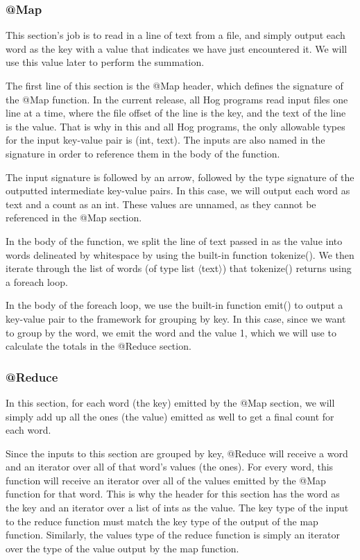 \documentclass{article} \usepackage{fancyhdr, multicol}
\begin{document}
\subsubsection*{@Map}
This section's job is to read in a line of text from a file, and simply output each word as the key with a value that indicates we have just encountered it. We will use this value later to perform the summation.

The first line of this section is the @Map header, which defines the signature of the @Map function. In the current release, all Hog programs read input files one line at a time, where the file offset of the line is the key, and the text of the line is the value. That is why in this and all Hog programs, the only allowable types for the input key-value pair is (int, text). The inputs are also named in the signature in order to reference them in the body of the function.

The input signature is followed by an arrow, followed by the type signature of the outputted intermediate key-value pairs. In this case, we will output each word as text and a count as an int. These values are unnamed, as they cannot be referenced in the @Map section.

In the body of the function, we split the line of text passed in as the value into words delineated by whitespace by using the built-in function tokenize(). We then iterate through the list of words (of type list $\langle$text$\rangle$) that tokenize() returns using a foreach loop. 

In the body of the foreach loop, we use the built-in function emit() to output a key-value pair to the framework for grouping by key. In this case, since we want to group by the word, we emit the word and the value 1, which we will use to calculate the totals in the @Reduce section.

\subsubsection*{@Reduce}
In this section, for each word (the key) emitted by the @Map section, we will simply add up all the ones (the value) emitted as well to get a final count for each word. 

Since the inputs to this section are grouped by key, @Reduce will receive a word and an iterator over all of that word's values (the ones). For every word, this function will receive an iterator over all of the values emitted by the @Map function for that word. This is why the header for this section has the word as the key and an iterator over a list of ints as the value. The key type of the input to the reduce function must match the key type of the output of the map function. Similarly, the values type of the reduce function is simply an iterator over the type of the value output by the map function.
\end{document}
